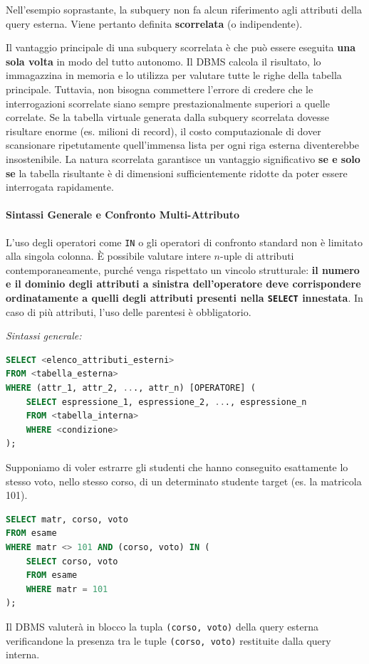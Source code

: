 \begin{warningbox}
Nell'esempio soprastante, la subquery non fa alcun riferimento agli attributi della query esterna. Viene pertanto definita \textbf{scorrelata} (o indipendente).

Il vantaggio principale di una subquery scorrelata è che può essere eseguita \textbf{una sola volta} in modo del tutto autonomo. Il DBMS calcola il risultato, lo immagazzina in memoria e lo utilizza per valutare tutte le righe della tabella principale. 
Tuttavia, non bisogna commettere l'errore di credere che le interrogazioni scorrelate siano sempre prestazionalmente superiori a quelle correlate. Se la tabella virtuale generata dalla subquery scorrelata dovesse risultare enorme (es. milioni di record), il costo computazionale di dover scansionare ripetutamente quell'immensa lista per ogni riga esterna diventerebbe insostenibile. La natura scorrelata garantisce un vantaggio significativo \textbf{se e solo se} la tabella risultante è di dimensioni sufficientemente ridotte da poter essere interrogata rapidamente.
\end{warningbox}

\paragraph{Sintassi Generale e Confronto Multi-Attributo}

L'uso degli operatori come \texttt{IN} o gli operatori di confronto standard non è limitato alla singola colonna. È possibile valutare intere $n$-uple di attributi contemporaneamente, purché venga rispettato un vincolo strutturale: \textbf{il numero e il dominio degli attributi a sinistra dell'operatore deve corrispondere ordinatamente a quelli degli attributi presenti nella \texttt{SELECT} innestata}. In caso di più attributi, l'uso delle parentesi è obbligatorio. 

\textit{Sintassi generale:}
\begin{lstlisting}[language=SQL, basicstyle=\ttfamily\small, keywordstyle=\color{blue}\bfseries]
SELECT <elenco_attributi_esterni>
FROM <tabella_esterna>
WHERE (attr_1, attr_2, ..., attr_n) [OPERATORE] (
    SELECT espressione_1, espressione_2, ..., espressione_n
    FROM <tabella_interna>
    WHERE <condizione>
);
\end{lstlisting}

\begin{example}
Supponiamo di voler estrarre gli studenti che hanno conseguito esattamente lo stesso voto, nello stesso corso, di un determinato studente target (es. la matricola 101).

\begin{lstlisting}[language=SQL, basicstyle=\ttfamily\small, keywordstyle=\color{blue}\bfseries]
SELECT matr, corso, voto
FROM esame
WHERE matr <> 101 AND (corso, voto) IN (
    SELECT corso, voto
    FROM esame
    WHERE matr = 101
);
\end{lstlisting}
Il DBMS valuterà in blocco la tupla \texttt{(corso, voto)} della query esterna verificandone la presenza tra le tuple \texttt{(corso, voto)} restituite dalla query interna.
\end{example}

